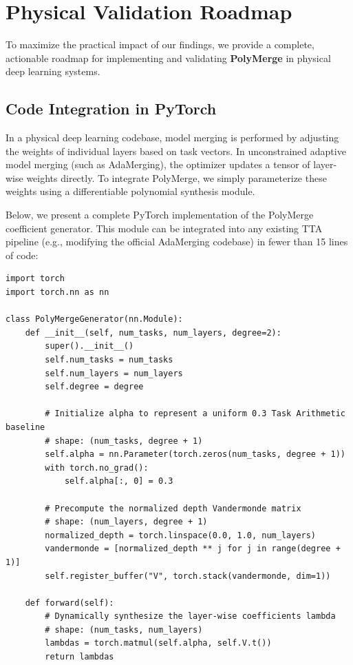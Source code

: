 \section{Physical Validation Roadmap}
\label{sec:appendix_roadmap}

To maximize the practical impact of our findings, we provide a complete, actionable roadmap for implementing and validating \textbf{PolyMerge} in physical deep learning systems. 

\subsection{Code Integration in PyTorch}
In a physical deep learning codebase, model merging is performed by adjusting the weights of individual layers based on task vectors. In unconstrained adaptive model merging (such as AdaMerging), the optimizer updates a tensor of layer-wise weights directly. To integrate PolyMerge, we simply parameterize these weights using a differentiable polynomial synthesis module.

Below, we present a complete PyTorch implementation of the PolyMerge coefficient generator. This module can be integrated into any existing TTA pipeline (e.g., modifying the official AdaMerging codebase) in fewer than 15 lines of code:

\begin{small}
\begin{verbatim}
import torch
import torch.nn as nn

class PolyMergeGenerator(nn.Module):
    def __init__(self, num_tasks, num_layers, degree=2):
        super().__init__()
        self.num_tasks = num_tasks
        self.num_layers = num_layers
        self.degree = degree
        
        # Initialize alpha to represent a uniform 0.3 Task Arithmetic baseline
        # shape: (num_tasks, degree + 1)
        self.alpha = nn.Parameter(torch.zeros(num_tasks, degree + 1))
        with torch.no_grad():
            self.alpha[:, 0] = 0.3
            
        # Precompute the normalized depth Vandermonde matrix
        # shape: (num_layers, degree + 1)
        normalized_depth = torch.linspace(0.0, 1.0, num_layers)
        vandermonde = [normalized_depth ** j for j in range(degree + 1)]
        self.register_buffer("V", torch.stack(vandermonde, dim=1))
        
    def forward(self):
        # Dynamically synthesize the layer-wise coefficients lambda
        # shape: (num_tasks, num_layers)
        lambdas = torch.matmul(self.alpha, self.V.t())
        return lambdas
\end{verbatim}
\end{small}

